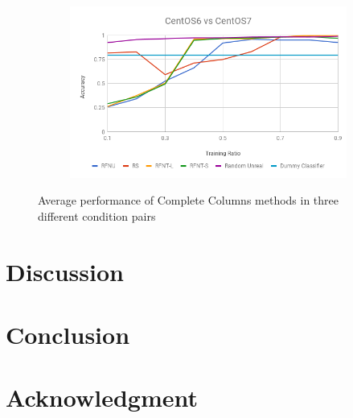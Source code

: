 \documentclass[10pt, conference, compsocconf]{IEEEtran}
\begin{document}
\begin{figure}[h!]
\begin{subfigure}[b]{0.4\linewidth}
        \end{subfigure}
        \begin{subfigure}[b]{0.4\linewidth}
                \includegraphics[width=\columnwidth]{figures/simple-methods-6vs7}
        \end{subfigure}
	\caption{Average performance of Complete Columns methods in three different condition pairs}
	\label{fig:simple-methods}
\end{figure}



\section{Discussion}






\section{Conclusion}


\section*{Acknowledgment}



\end{document}
